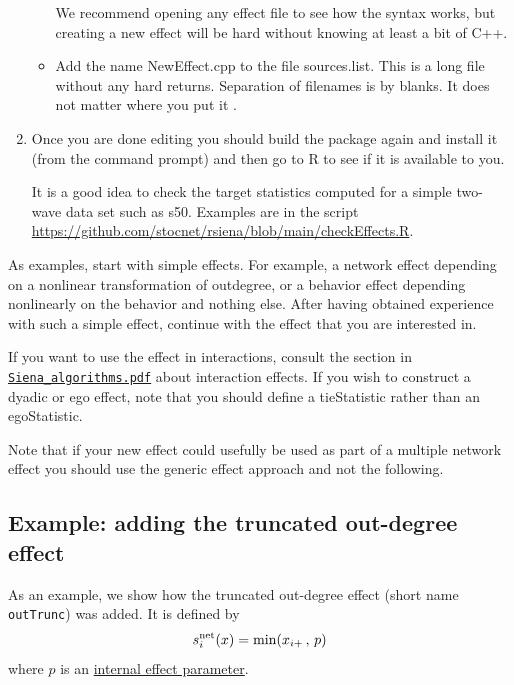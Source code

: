 \documentclass[a4paper,fleqn,11pt]{article}
\newcommand{\+}{\, + \,}
\newcommand{\sfn}[1]{\textsf{#1}}
\begin{document}
\begin{enumerate}
\begin{itemize}
                  We recommend opening any effect file to see
                  how the syntax works, but creating a new effect will be hard
                   without knowing at least a bit of C++.
            \item Add the name \textsf{NewEffect.cpp} to the file \textsf{sources.list}.
                  This is a long file without any hard returns.
                  Separation of filenames is by blanks.
                  It does not matter where you put it .
		\end{itemize}

		\item Once you are done editing you should build
the package again and install it (from the command prompt)
and then go to R to see if it is available to you.

It is a good idea to check the target statistics computed for a simple
two-wave data set such as \sfn{s50}.
Examples are in the script
\url{https://github.com/stocnet/rsiena/blob/main/checkEffects.R}.
\end{enumerate}

As examples, start with simple effects.
For example, a network effect depending on a nonlinear transformation
of outdegree, or a behavior effect depending nonlinearly
on the behavior and nothing else.
After having obtained experience with such a simple effect,
continue with the effect that you are interested in.
\medskip

If you want to use the effect in interactions, consult the section in
\href{http://www.stats.ox.ac.uk/~snijders/siena/Siena_algorithms.pdf}{\texttt{Siena\_algorithms.pdf}}
about interaction effects.
If you wish to construct a dyadic or ego effect, note that
you should define a \sfn{tieStatistic}
rather than an \sfn{egoStatistic}.
\medskip

Note that if your new effect could usefully be used as part of a multiple
network effect you should use the generic effect approach and not the following.


\subsection{Example: adding the truncated out-degree effect}

As an example, we show how the truncated out-degree effect
(short name \texttt{outTrunc}) was added. It is
 defined by
 \begin{equation}
  s^{\rm net}_{i}(x) = \text{min}(x_{i+}\,,\, p)   \label{outTrunc}
 \end{equation}
where $p$ is an \hyperlink{T_effpar}{internal effect parameter}.
\end{document}
